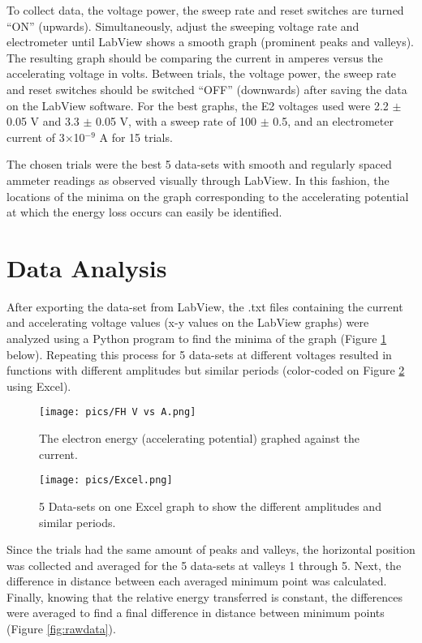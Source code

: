 \documentclass[12pt, letterpaper, twoside]{article}
\begin{document}
To collect data, the voltage power, the sweep rate and reset switches are turned “ON” (upwards). Simultaneously, adjust the sweeping voltage rate and electrometer until LabView shows a smooth graph (prominent peaks and valleys). The resulting graph should be comparing the current in amperes versus the accelerating voltage in volts. Between trials, the voltage power, the sweep rate and reset switches should be switched “OFF” (downwards) after saving the data on the LabView software. For the best graphs, the E2 voltages used were 2.2 $\pm$ 0.05 V and 3.3 $\pm$ 0.05 V, with a sweep rate of 100 $\pm$ 0.5, and an electrometer current of 3$\times $10$^{-9}$ A for 15 trials.

The chosen trials were the best 5 data-sets with smooth and regularly spaced ammeter readings as observed visually through LabView. In this fashion, the locations of the minima on the graph corresponding to the accelerating potential at which the energy loss occurs can easily be identified.

\section{Data Analysis}

After exporting the data-set from LabView, the .txt files containing the current and accelerating voltage values (x-y values on the LabView graphs) were analyzed using a Python program to find the minima of the graph (Figure \ref{fig:maingraph} below). Repeating this process for 5 data-sets at different voltages resulted in functions with different amplitudes but similar periods (color-coded on Figure \ref{fig:excelgraph} using Excel). 

\begin{figure}[!ht]
    \centering
    \texttt{[image: pics/FH V vs A.png]}
    \caption{The electron energy (accelerating potential) graphed against the current.}
    \label{fig:maingraph}
\end{figure}

\begin{figure}[!ht]
    \centering
    \texttt{[image: pics/Excel.png]}
    \caption{5 Data-sets on one Excel graph to show the different amplitudes and similar periods.}
    \label{fig:excelgraph}
\end{figure}

Since the trials had the same amount of peaks and valleys, the horizontal position was collected and averaged for the 5 data-sets at valleys 1 through 5. Next, the difference in distance between each averaged minimum point was calculated. Finally, knowing that the relative energy transferred is constant, the differences were averaged to find a final difference in distance between minimum points (Figure \ref{fig:rawdata}). 
\vfill\pagebreak
\end{document}
